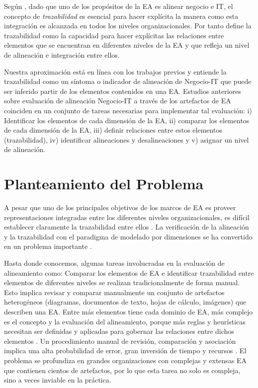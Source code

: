 Seg\'un \cite{wegmann:2003, Wegmann:2005, Anaya:2005}, dado que uno de los prop\'ositos de la EA es alinear negocio e IT, el concepto de \textit{trazabilidad} es esencial para hacer expl\'icita la manera como esta integraci\'on es alcanzada en todos los niveles organizacionales. Por tanto \cite{wegmann:2003} define la trazabilidad como la capacidad para hacer expl\'icitas las relaciones entre elementos que se encuentran en diferentes niveles de la EA y que refleja un nivel de alineaci\'on e integraci\'on entre ellos.

Nuestra aproximaci\'on est\'a en l\'inea con los trabajos previos y entiende la trazabilidad como un s\'intoma o indicador de alineaci\'on de Negocio-IT que puede ser inferido partir de los elementos contenidos en una EA. Estudios anteriores sobre evaluaci\'on de alineaci\'on Negocio-IT a trav\'es de los artefactos de EA coinciden en un conjunto de tareas necesarias para implementar tal evaluaci\'on: i) Identificar los elementos de cada dimensi\'on de la EA, ii) comparar los elementos de cada dimensi\'on de la EA, iii) definir relaciones entre estos elementos (trazabilidad), iv) identificar alineaciones y desalineaciones y v) asignar un nivel de alineaci\'on.

\section{Planteamiento del Problema} \label{sec:problem}

A pesar que uno de los principales objetivos de los marcos de EA es proveer representaciones integradas entre los diferentes niveles organizacionales, es dif\'icil establecer claramente la trazabilidad entre ellos \cite{wegmann:2003}. La verificaci\'on de la alineaci\'on y la trazabilidad con el paradigma de modelado por dimensiones se ha convertido en un problema importante \cite{Wegmann:2005}. 

Hasta donde conocemos, algunas tareas involucradas en la evaluaci\'on de alineamiento como: Comparar los elementos de EA e identificar trazabilidad entre elementos de diferentes niveles se realizan tradicionalmente de forma manual. Esto implica revisar y comparar manualmente un conjunto de artefactos heterog\'eneos (diagramas, documentos de texto, hojas de c\'alculo, im\'agenes) que describen una EA. Entre m\'as elementos tiene cada dominio de EA, m\'as complejo es el concepto y la evaluaci\'on del alineamiento, porque m\'as reglas y heur\'isticas necesitan ser definidas y aplicadas para gobernar las relaciones entre dichos elementos \cite{Sousa:2005}. Un procedimiento manual de revisi\'on, comparaci\'on y asociaci\'on implica una alta probabilidad de error, gran inversi\'on de tiempo y recursos \cite{Rahm:2001}. El problema se profundiza en grandes organizaciones con complejas y extensas EA que contienen cientos de artefactos, por lo que esta tarea no solo es compleja, sino a veces inviable en la pr\'actica. 

